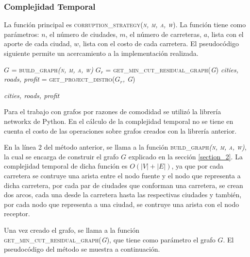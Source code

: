 \documentclass[10pt]{article} %
\begin{document}
	\subsubsection{Complejidad Temporal}
	
	La funci\'on principal es \textsc{corruption\_strategy(\textit{n, m, a, w})}. La funci\'on tiene como par\'ametros: $n$, el n\'umero de ciudades, $m$, el n\'umero de carreteras, $a$, lista con el aporte de cada ciudad, $w$, lista con el costo de cada carretera. El pseudoc\'odigo siguiente permite un acercamiento a la implementaci\'on realizada.
	
	\begin{algorithmic}[1]
		
		\State $G$ = \textsc{build\_graph\textit{(n, m, a, w)}}
		\State $G_r$ =\textsc{ get\_min\_cut\_residual\_graph(\textit{G})}
		\State \textit{cities, roads, profit} = \textsc{get\_project\_distro(\textit{$G_r$, G})}
		
		\Return \textit{cities, roads, profit}
		\EndFunction
	\end{algorithmic}

	Para el trabajo con grafos por razones de comodidad se utilizó la librería networkx de Python.	En el cálculo de la complejidad temporal no se tiene en cuenta el costo de las operaciones sobre
	grafos creados con la librería anterior.
	
	En la l\'inea 2 del m\'etodo anterior, se llama a la funci\'on \textsc{build\_graph\textit{(n, m, a, w)}}, la cual se encarga de construir el grafo $G$ explicado en la secci\'on \ref{section_2}. La complejidad temporal de dicha funci\'on es $O(|V| + |E|)$, ya que por cada carretera se contruye una arista entre el nodo fuente y el nodo que representa a dicha carretera,  por cada par de ciudades que conforman una carretera, se crean dos arcos, cada una desde la carretera hasta las respectivas ciudades y tambi\'en, por cada nodo que representa a una ciudad, se contruye una arista con el nodo receptor.
	
	Una vez creado el grafo, se llama a la funci\'on \textsc{ get\_min\_cut\_residual\_graph(\textit{G})}, que tiene como par\'ametro el grafo $G$. El pseudoc\'odigo del m\'etodo se muestra a continuaci\'on.
	
\end{document}
